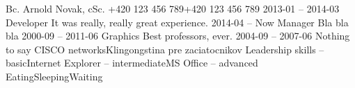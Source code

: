 \documentclass[english]{ecv}
\begin{document}
\begin{ecv}
   {Bc. Arnold Novak, cSc.}
 {+420 123 456 789\ecvNewLine +420 123 456 789}
 {\ecvNewLine {}}
 {2013-01 -- 2014-03}
 {}
 {Developer}
 {It was really,
            really great experience.
        }
 {2014-04 -- Now}
 {}
 {Manager}
 {Bla bla bla}
 {2000-09 -- 2011-06}
 {}
 {Graphics}
 {Best professors,
            ever.
        }
 {2004-09 -- 2007-06}
 {}
 {Nothing to say}
 {CISCO networks\ecvNewLine Klingongstina pre zaciatocnikov}
 {Leadership skills -- basic\ecvNewLine Internet Explorer -- intermediate\ecvNewLine MS Office -- advanced}
 {Eating\ecvNewLine Sleeping\ecvNewLine Waiting}
\end{ecv}
\end{document}
